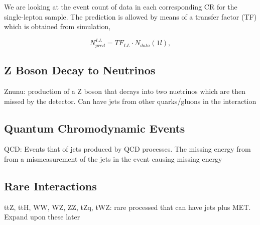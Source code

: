 We are looking at the event count of data in each corresponding CR for the single-lepton sample. The prediction is allowed by means of a transfer factor (TF) which is obtained from simulation,

\begin{equation}
\label{eqn:LLTF}
N_{pred}^{LL}=TF_{LL} \cdot N_{data}(1l),
\end{equation}



\subsection{Z Boson Decay to Neutrinos}
\label{subsec:Znunu}

Znunu: production of a Z boson that decays into two nuetrinos which are then missed by the detector. Can have jets from other quarks/gluons in the interaction

\subsection{Quantum Chromodynamic Events}
\label{subsec:QCD}

QCD: Events that of jets produced by QCD processes. The missing energy from from a mismeasurement of the jets in the event causing missing energy

\subsection{Rare Interactions}
\label{subsec:rare}

ttZ, ttH, WW, WZ, ZZ, tZq, tWZ: rare processed that can have jets plus MET. Expand upon these later
